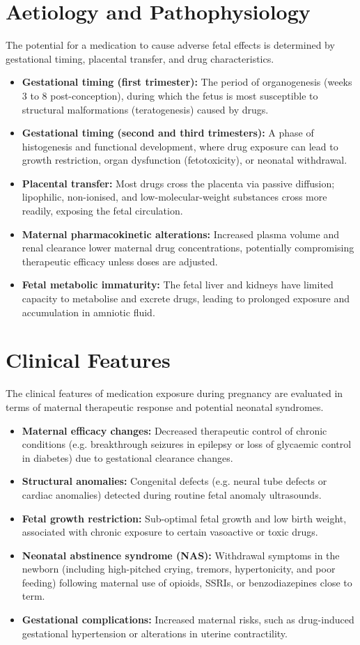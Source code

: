 \section*{Aetiology and Pathophysiology}
The potential for a medication to cause adverse fetal effects is determined by gestational timing, placental transfer, and drug characteristics.
\begin{itemize}
    \item \textbf{Gestational timing (first trimester):} The period of organogenesis (weeks 3 to 8 post-conception), during which the fetus is most susceptible to structural malformations (teratogenesis) caused by drugs.
    \item \textbf{Gestational timing (second and third trimesters):} A phase of histogenesis and functional development, where drug exposure can lead to growth restriction, organ dysfunction (fetotoxicity), or neonatal withdrawal.
    \item \textbf{Placental transfer:} Most drugs cross the placenta via passive diffusion; lipophilic, non-ionised, and low-molecular-weight substances cross more readily, exposing the fetal circulation.
    \item \textbf{Maternal pharmacokinetic alterations:} Increased plasma volume and renal clearance lower maternal drug concentrations, potentially compromising therapeutic efficacy unless doses are adjusted.
    \item \textbf{Fetal metabolic immaturity:} The fetal liver and kidneys have limited capacity to metabolise and excrete drugs, leading to prolonged exposure and accumulation in amniotic fluid.
\end{itemize}

\section*{Clinical Features}
The clinical features of medication exposure during pregnancy are evaluated in terms of maternal therapeutic response and potential neonatal syndromes.
\begin{itemize}
    \item \textbf{Maternal efficacy changes:} Decreased therapeutic control of chronic conditions (e.g. breakthrough seizures in epilepsy or loss of glycaemic control in diabetes) due to gestational clearance changes.
    \item \textbf{Structural anomalies:} Congenital defects (e.g. neural tube defects or cardiac anomalies) detected during routine fetal anomaly ultrasounds.
    \item \textbf{Fetal growth restriction:} Sub-optimal fetal growth and low birth weight, associated with chronic exposure to certain vasoactive or toxic drugs.
    \item \textbf{Neonatal abstinence syndrome (NAS):} Withdrawal symptoms in the newborn (including high-pitched crying, tremors, hypertonicity, and poor feeding) following maternal use of opioids, SSRIs, or benzodiazepines close to term.
    \item \textbf{Gestational complications:} Increased maternal risks, such as drug-induced gestational hypertension or alterations in uterine contractility.
\end{itemize}

